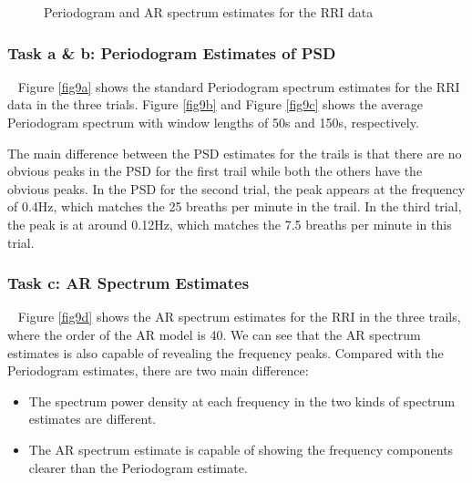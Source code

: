 \documentclass[10pt]{article}
\begin{document}
\begin{figure}[htbp]
{        \label{fig9c}
    }
    \caption{Periodogram and AR spectrum estimates for the RRI data}
    \label{fig9}
\end{figure}

\subsubsection{Task a \& b: Periodogram Estimates of PSD}
\ \indent
Figure \ref{fig9a} shows the standard Periodogram spectrum estimates for the RRI 
data in the three trials. Figure \ref{fig9b} and Figure \ref{fig9c} shows the average 
Periodogram spectrum with window lengths of 50s and 150s, respectively.

The main difference between the PSD estimates for the trails is that 
there are no obvious peaks in the PSD for the first trail while both 
the others have the obvious peaks. In the PSD for the second trial, 
the peak appears at the frequency of 0.4Hz, which matches the 25 breaths 
per minute in the trail. In the third trial, the peak is at around 0.12Hz, 
which matches the 7.5 breaths per minute in this trial.

\subsubsection{Task c: AR Spectrum Estimates}
\ \indent
Figure \ref{fig9d} shows the AR spectrum estimates for the RRI in the three trails, 
where the order of the AR model is 40. We can see that the AR spectrum 
estimates is also capable of revealing the frequency peaks. Compared 
with the Periodogram estimates, there are two main difference:
\begin{itemize}
	\item The spectrum power density at each frequency in the two kinds 
	of spectrum estimates are different.
	\item The AR spectrum estimate is capable of showing the frequency 
	components clearer than the Periodogram estimate.
\end{itemize}
\end{document}
